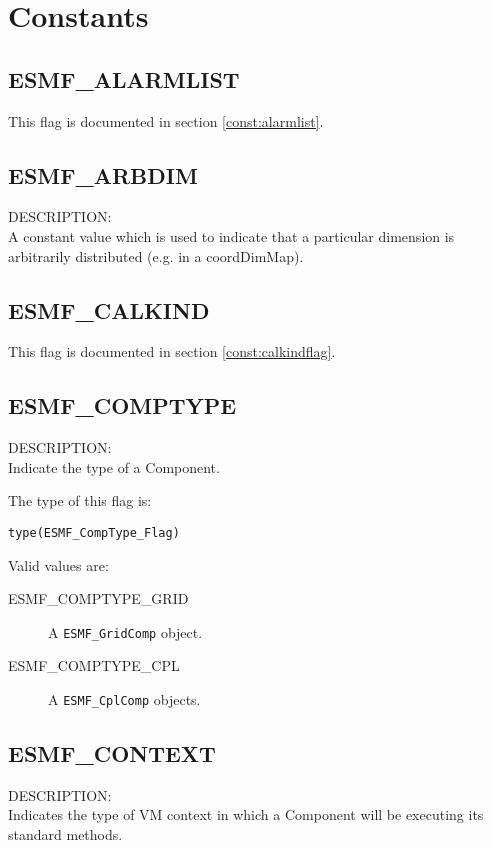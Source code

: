 
\section{Constants}

\subsection{ESMF\_ALARMLIST}
This flag is documented in section \ref{const:alarmlist}.

\subsection{ESMF\_ARBDIM}
\label{const:arbdim}

{\sf DESCRIPTION:\\}
A constant value which is used to indicate that a particular dimension is arbitrarily distributed (e.g. in a coordDimMap). 

\subsection{ESMF\_CALKIND}
This flag is documented in section \ref{const:calkindflag}.

\subsection{ESMF\_COMPTYPE}
\label{const:comptype}
{\sf DESCRIPTION:\\}
Indicate the type of a Component.

The type of this flag is:

{\tt type(ESMF\_CompType\_Flag)}

Valid values are:
\begin{description}
	\item[ESMF\_COMPTYPE\_GRID]
	A {\tt ESMF\_GridComp} object. 
	\item[ESMF\_COMPTYPE\_CPL]
	A {\tt ESMF\_CplComp} objects.
\end{description}


\subsection{ESMF\_CONTEXT}
\label{const:contextflag}
{\sf DESCRIPTION:\\}  
Indicates the type of VM context in which a Component will be executing its
standard methods.

